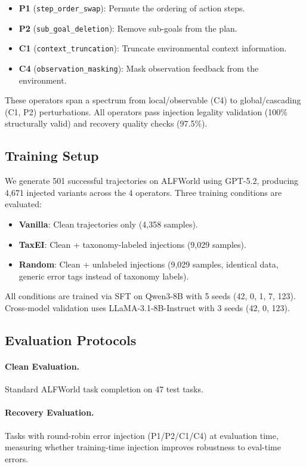 \documentclass[11pt,a4paper]{article}
\begin{document}
\begin{itemize}
\item \textbf{P1} (\texttt{step\_order\_swap}): Permute the ordering of action steps.
\item \textbf{P2} (\texttt{sub\_goal\_deletion}): Remove sub-goals from the plan.
\item \textbf{C1} (\texttt{context\_truncation}): Truncate environmental context information.
\item \textbf{C4} (\texttt{observation\_masking}): Mask observation feedback from the environment.
\end{itemize}

These operators span a spectrum from local/observable (C4) to global/cascading (C1, P2) perturbations.
All operators pass injection legality validation (100\% structurally valid) and recovery quality checks (97.5\%).

\subsection{Training Setup}

We generate 501 successful trajectories on ALFWorld using GPT-5.2, producing 4,671 injected variants across the 4 operators.
Three training conditions are evaluated:

\begin{itemize}
\item \textbf{Vanilla}: Clean trajectories only (4,358 samples).
\item \textbf{TaxEI}: Clean + taxonomy-labeled injections (9,029 samples).
\item \textbf{Random}: Clean + unlabeled injections (9,029 samples, identical data, generic error tags instead of taxonomy labels).
\end{itemize}

All conditions are trained via SFT on Qwen3-8B with 5 seeds (42, 0, 1, 7, 123).
Cross-model validation uses LLaMA-3.1-8B-Instruct with 3 seeds (42, 0, 123).

\subsection{Evaluation Protocols}

\paragraph{Clean Evaluation.} Standard ALFWorld task completion on 47 test tasks.
\paragraph{Recovery Evaluation.} Tasks with round-robin error injection (P1/P2/C1/C4) at evaluation time, measuring whether training-time injection improves robustness to eval-time errors.
\end{document}
